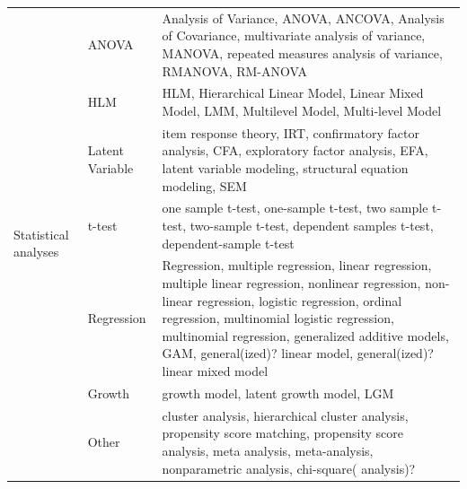 \documentclass[
  english,
  ,man]{apa6}
\begin{document}
\begin{table}
\begin{tabularx}{\linewidth}{llX}
\multirow{7}{*}{Statistical analyses} & ANOVA           & Analysis of Variance, ANOVA, ANCOVA, Analysis of Covariance, multivariate analysis of variance, MANOVA, repeated measures analysis of variance, RMANOVA, RM-ANOVA                                                                                                                                                               \\
                                    & HLM             & HLM, Hierarchical Linear Model, Linear Mixed Model, LMM, Multilevel Model, Multi-level Model                                                                                                                                                                                                                                    \\
                                    & Latent Variable & item response theory, IRT, confirmatory factor analysis, CFA, exploratory factor analysis, EFA, latent variable modeling, structural equation modeling, SEM                                                                                                                                                                     \\
                                    & t-test          & one sample t-test, one-sample t-test, two sample t-test, two-sample t-test, dependent samples t-test, dependent-sample t-test                                                                                                                                                                                                   \\
                                    & Regression      & Regression, multiple regression, linear regression, multiple linear regression, nonlinear regression, non-linear regression, logistic regression, ordinal regression, multinomial logistic regression, multinomial regression, generalized additive models, GAM, general(ized)? linear model, general(ized)? linear mixed model \\
                                    & Growth          & growth model, latent growth model, LGM                                                                                                                                                                                                                                                                                          \\
                                    & Other           & cluster analysis, hierarchical cluster analysis, propensity score matching, propensity score analysis, meta analysis, meta-analysis, nonparametric analysis, chi-square( analysis)?                                                                                                                                             \\
\bottomrule

\end{tabularx}
\end{table}
\end{document}
